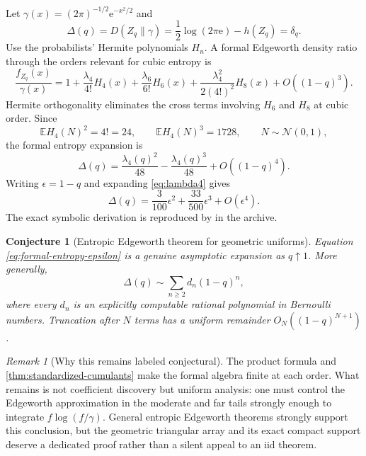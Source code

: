 \documentclass[11pt,oneside]{article}
\newtheorem{conjecture}[theorem]{Conjecture}
\theoremstyle{definition}
\theoremstyle{remark}
\newtheorem{remark}[theorem]{Remark}
\newcommand{\E}{\mathbb E}
\newcommand{\e}{\mathrm e}
\begin{document}
Let $\gamma(x)=(2\pi)^{-1/2}\e^{-x^2/2}$ and
\begin{equation}
 \Delta(q)=D(Z_q\|\gamma)
 =\frac12\log(2\pi\e)-h(Z_q)
 =\delta_q.
 \label{eq:standardized-deficit}
\end{equation}
Use the probabilists' Hermite polynomials $H_n$.  A formal Edgeworth density ratio
through the orders relevant for cubic entropy is
\begin{equation}
 \frac{f_{Z_q}(x)}{\gamma(x)}
 =1+\frac{\lambda_4}{4!}H_4(x)
   +\frac{\lambda_6}{6!}H_6(x)
   +\frac{\lambda_4^2}{2(4!)^2}H_8(x)
   +O((1-q)^3).
 \label{eq:formal-Edgeworth}
\end{equation}
Hermite orthogonality eliminates the cross terms involving $H_6$ and $H_8$ at
cubic order.  Since
\begin{equation}
 \E H_4(N)^2=4!=24,
 \qquad
 \E H_4(N)^3=1728,
 \qquad N\sim\mathcal N(0,1),
 \label{eq:H4-moments}
\end{equation}
the formal entropy expansion is
\begin{equation}
 \Delta(q)
 =\frac{\lambda_4(q)^2}{48}
  -\frac{\lambda_4(q)^3}{48}
  +O((1-q)^4).
 \label{eq:formal-entropy-lambda}
\end{equation}
Writing $\epsilon=1-q$ and expanding \eqref{eq:lambda4} gives
\begin{equation}
 \boxed{
 \Delta(q)
 =\frac3{100}\epsilon^2
  +\frac{33}{500}\epsilon^3
  +O(\epsilon^4).}
 \label{eq:formal-entropy-epsilon}
\end{equation}
The exact symbolic derivation is reproduced by
 in the archive.

\begin{conjecture}[Entropic Edgeworth theorem for geometric uniforms]
\label{conj:entropic-edgeworth}
Equation \eqref{eq:formal-entropy-epsilon} is a genuine asymptotic expansion as
$q\uparrow1$.  More generally,
\begin{equation}
 \Delta(q)\sim\sum_{n\ge2}d_n(1-q)^n,
 \label{eq:full-entropic-series}
\end{equation}
where every $d_n$ is an explicitly computable rational polynomial in Bernoulli
numbers.  Truncation after $N$ terms has a uniform remainder
$O_N((1-q)^{N+1})$.
\end{conjecture}

\begin{remark}[Why this remains labeled conjectural]
The product formula and \cref{thm:standardized-cumulants} make the formal algebra
finite at each order.  What remains is not coefficient discovery but uniform
analysis: one must control the Edgeworth approximation in the moderate and far
tails strongly enough to integrate $f\log(f/\gamma)$.  General entropic
Edgeworth theorems strongly support this conclusion, but the geometric triangular
array and its exact compact support deserve a dedicated proof rather than a silent
appeal to an iid theorem.
\end{remark}
\end{document}
